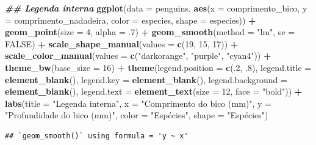 \documentclass[
]{article}
\newenvironment{Shaded}{\begin{snugshade}}{\end{snugshade}}
\newcommand{\AttributeTok}[1]{\textcolor[rgb]{0.13,0.29,0.53}{#1}}
\newcommand{\ConstantTok}[1]{\textcolor[rgb]{0.56,0.35,0.01}{#1}}
\newcommand{\DecValTok}[1]{\textcolor[rgb]{0.00,0.00,0.81}{#1}}
\newcommand{\DocumentationTok}[1]{\textcolor[rgb]{0.56,0.35,0.01}{\textbf{\textit{#1}}}}
\newcommand{\FunctionTok}[1]{\textcolor[rgb]{0.13,0.29,0.53}{\textbf{#1}}}
\newcommand{\NormalTok}[1]{#1}
\newcommand{\SpecialCharTok}[1]{\textcolor[rgb]{0.81,0.36,0.00}{\textbf{#1}}}
\newcommand{\StringTok}[1]{\textcolor[rgb]{0.31,0.60,0.02}{#1}}
\begin{document}
\begin{Shaded}
\begin{Highlighting}[]
\DocumentationTok{\#\# Legenda interna}
\FunctionTok{ggplot}\NormalTok{(}\AttributeTok{data =}\NormalTok{ penguins, }
       \FunctionTok{aes}\NormalTok{(}\AttributeTok{x =}\NormalTok{ comprimento\_bico, }\AttributeTok{y =}\NormalTok{ comprimento\_nadadeira,}
           \AttributeTok{color =}\NormalTok{ especies, }\AttributeTok{shape =}\NormalTok{ especies)) }\SpecialCharTok{+}
    \FunctionTok{geom\_point}\NormalTok{(}\AttributeTok{size =} \DecValTok{4}\NormalTok{, }\AttributeTok{alpha =}\NormalTok{ .}\DecValTok{7}\NormalTok{) }\SpecialCharTok{+}
    \FunctionTok{geom\_smooth}\NormalTok{(}\AttributeTok{method =} \StringTok{"lm"}\NormalTok{, }\AttributeTok{se =} \ConstantTok{FALSE}\NormalTok{) }\SpecialCharTok{+}
    \FunctionTok{scale\_shape\_manual}\NormalTok{(}\AttributeTok{values =} \FunctionTok{c}\NormalTok{(}\DecValTok{19}\NormalTok{, }\DecValTok{15}\NormalTok{, }\DecValTok{17}\NormalTok{)) }\SpecialCharTok{+}
    \FunctionTok{scale\_color\_manual}\NormalTok{(}\AttributeTok{values =} \FunctionTok{c}\NormalTok{(}\StringTok{"darkorange"}\NormalTok{, }\StringTok{"purple"}\NormalTok{, }\StringTok{"cyan4"}\NormalTok{)) }\SpecialCharTok{+}
    \FunctionTok{theme\_bw}\NormalTok{(}\AttributeTok{base\_size =} \DecValTok{16}\NormalTok{) }\SpecialCharTok{+}
    \FunctionTok{theme}\NormalTok{(}\AttributeTok{legend.position =} \FunctionTok{c}\NormalTok{(.}\DecValTok{2}\NormalTok{, .}\DecValTok{8}\NormalTok{),}
          \AttributeTok{legend.title =} \FunctionTok{element\_blank}\NormalTok{(),}
          \AttributeTok{legend.key =}  \FunctionTok{element\_blank}\NormalTok{(),}
          \AttributeTok{legend.background =} \FunctionTok{element\_blank}\NormalTok{(),}
          \AttributeTok{legend.text =} \FunctionTok{element\_text}\NormalTok{(}\AttributeTok{size =} \DecValTok{12}\NormalTok{, }\AttributeTok{face =} \StringTok{"bold"}\NormalTok{)) }\SpecialCharTok{+}
    \FunctionTok{labs}\NormalTok{(}\AttributeTok{title =} \StringTok{"Legenda interna"}\NormalTok{, }\AttributeTok{x =} \StringTok{"Comprimento do bico (mm)"}\NormalTok{, }
         \AttributeTok{y =} \StringTok{"Profundidade do bico (mm)"}\NormalTok{, }\AttributeTok{color =} \StringTok{"Espécies"}\NormalTok{, }\AttributeTok{shape =} \StringTok{"Espécies"}\NormalTok{)}
\end{Highlighting}
\end{Shaded}

\begin{verbatim}
## `geom_smooth()` using formula = 'y ~ x'
\end{verbatim}
\end{document}
